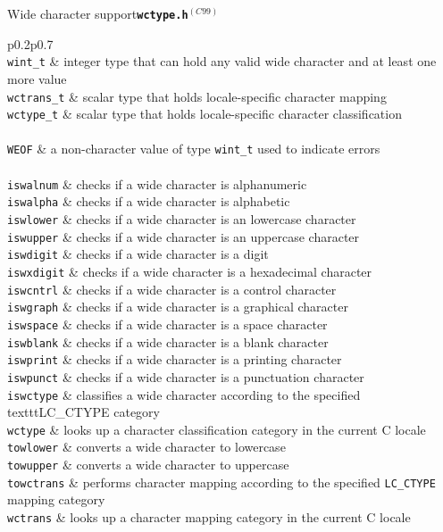 \documentclass{article}
\newcommand{\newstd}{\ensuremath{^{(C99)}}\xspace}
\newcommand{\librarysection}[5]{{\vspace{2ex}\large #1\quad\textbf{\texttt{#2}}}\par\begin{supertabular}{p{#3\linewidth}p{#4\linewidth}}#5\end{supertabular}}
\newcommand{\funcdescription}[2]{\texttt{#1} & #2 \\}
\newcommand{\smallheader}[1]{\multicolumn{2}{c}{#1} \\}
\begin{document}
\begin{multicols*}{3}
\librarysection{Wide character support}{wctype.h\newstd}{0.2}{0.7}{
\smallheader{\underline{Types}}
\funcdescription{wint\_t}{integer type that can hold any valid wide character and at least one more value}
\funcdescription{wctrans\_t}{scalar type that holds locale-specific character mapping}
\funcdescription{wctype\_t}{scalar type that holds locale-specific character classification}
\smallheader{\underline{Macros}}
\funcdescription{WEOF}{a non-character value of type \texttt{wint\_t} used to indicate errors}
\smallheader{\underline{Functions}}
\funcdescription{iswalnum}{checks if a wide character is alphanumeric}
\funcdescription{iswalpha}{checks if a wide character is alphabetic}
\funcdescription{iswlower}{checks if a wide character is an lowercase character}
\funcdescription{iswupper}{checks if a wide character is an uppercase character}
\funcdescription{iswdigit}{checks if a wide character is a digit}
\funcdescription{iswxdigit}{checks if a wide character is a hexadecimal character}
\funcdescription{iswcntrl}{checks if a wide character is a control character}
\funcdescription{iswgraph}{checks if a wide character is a graphical character}
\funcdescription{iswspace}{checks if a wide character is a space character}
\funcdescription{iswblank}{checks if a wide character is a blank character}
\funcdescription{iswprint}{checks if a wide character is a printing character}
\funcdescription{iswpunct}{checks if a wide character is a punctuation character}
\funcdescription{iswctype}{classifies a wide character according to the specified texttt{LC\_CTYPE} category}
\funcdescription{wctype}{looks up a character classification category in the current C locale}
\funcdescription{towlower}{converts a wide character to lowercase}
\funcdescription{towupper}{converts a wide character to uppercase}
\funcdescription{towctrans}{performs character mapping according to the specified \texttt{LC\_CTYPE} mapping category}
\funcdescription{wctrans}{looks up a character mapping category in the current C locale}
}

\end{multicols*}
\end{document}
